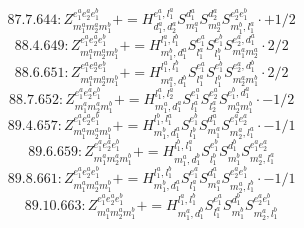 \documentclass[letterpaper,10pt,fleqn,leqno,onecolumn]{article}
\begin{document}
\begin{equation} \;\;\;\;\;\;  87.7.644: Z^{e_{1}^{a}e_{2}^{a}e_{1}^{b}}_{m_{1}^{a}m_{2}^{a}m_{1}^{b}}+=H^{e_{1}^{a},l_{1}^{a}}_{d_{1}^{a},d_{2}^{a}}S^{d_{1}^{a}}_{m_{1}^{a}}S^{d_{2}^{a}}_{m_{2}^{a}}S^{e_{2}^{a}e_{1}^{b}}_{m_{1}^{b},l_{1}^{a}}\cdot +1/2 \end{equation}
\begin{equation} \;\;\;\;\;\;  88.4.649: Z^{e_{1}^{a}e_{2}^{a}e_{1}^{b}}_{m_{1}^{a}m_{2}^{a}m_{1}^{b}}+=H^{l_{1}^{a},l_{1}^{b}}_{m_{1}^{b},d_{1}^{a}}S^{e_{1}^{a}}_{l_{1}^{a}}S^{e_{1}^{b}}_{l_{1}^{b}}S^{e_{2}^{a},d_{1}^{a}}_{m_{1}^{a}m_{2}^{a}}\cdot 2/2 \end{equation}
\begin{equation} \;\;\;\;\;\;  88.6.651: Z^{e_{1}^{a}e_{2}^{a}e_{1}^{b}}_{m_{1}^{a}m_{2}^{a}m_{1}^{b}}+=H^{l_{1}^{a},l_{1}^{b}}_{m_{1}^{a},d_{1}^{b}}S^{e_{1}^{a}}_{l_{1}^{a}}S^{e_{1}^{b}}_{l_{1}^{b}}S^{e_{2}^{a},d_{1}^{b}}_{m_{2}^{a}m_{1}^{b}}\cdot 2/2 \end{equation}
\begin{equation} \;\;\;\;\;\;  88.7.652: Z^{e_{1}^{a}e_{2}^{a}e_{1}^{b}}_{m_{1}^{a}m_{2}^{a}m_{1}^{b}}+=H^{l_{1}^{a},l_{2}^{a}}_{m_{1}^{a},d_{1}^{a}}S^{e_{1}^{a}}_{l_{1}^{a}}S^{e_{2}^{a}}_{l_{2}^{a}}S^{e_{1}^{b},d_{1}^{a}}_{m_{2}^{a}m_{1}^{b}}\cdot -1/2 \end{equation}
\begin{equation} \;\;\;\;\;\;  89.4.657: Z^{e_{1}^{a}e_{2}^{a}e_{1}^{b}}_{m_{1}^{a}m_{2}^{a}m_{1}^{b}}+=H^{l_{1}^{b},l_{1}^{a}}_{m_{1}^{b},d_{1}^{a}}S^{e_{1}^{b}}_{l_{1}^{b}}S^{d_{1}^{a}}_{m_{1}^{a}}S^{e_{1}^{a}e_{2}^{a}}_{m_{2}^{a},l_{1}^{a}}\cdot -1/1 \end{equation}
\begin{equation} \;\;\;\;\;\;  89.6.659: Z^{e_{1}^{a}e_{2}^{a}e_{1}^{b}}_{m_{1}^{a}m_{2}^{a}m_{1}^{b}}+=H^{l_{1}^{b},l_{1}^{a}}_{m_{1}^{a},d_{1}^{b}}S^{e_{1}^{b}}_{l_{1}^{b}}S^{d_{1}^{b}}_{m_{1}^{b}}S^{e_{1}^{a}e_{2}^{a}}_{m_{2}^{a},l_{1}^{a}} \end{equation}
\begin{equation} \;\;\;\;\;\;  89.8.661: Z^{e_{1}^{a}e_{2}^{a}e_{1}^{b}}_{m_{1}^{a}m_{2}^{a}m_{1}^{b}}+=H^{l_{1}^{a},l_{1}^{b}}_{m_{1}^{b},d_{1}^{a}}S^{e_{1}^{a}}_{l_{1}^{a}}S^{d_{1}^{a}}_{m_{1}^{a}}S^{e_{2}^{a}e_{1}^{b}}_{m_{2}^{a},l_{1}^{b}}\cdot -1/1 \end{equation}
\begin{equation} \;\;\;\;\;\;  89.10.663: Z^{e_{1}^{a}e_{2}^{a}e_{1}^{b}}_{m_{1}^{a}m_{2}^{a}m_{1}^{b}}+=H^{l_{1}^{a},l_{1}^{b}}_{m_{1}^{a},d_{1}^{b}}S^{e_{1}^{a}}_{l_{1}^{a}}S^{d_{1}^{b}}_{m_{1}^{b}}S^{e_{2}^{a}e_{1}^{b}}_{m_{2}^{a},l_{1}^{b}} \end{equation}
\end{document}
